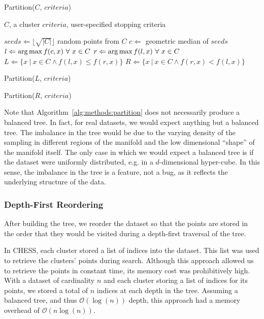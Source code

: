 \begin{algorithm} %
    \caption{Partition($C$, $criteria$)} %
    \label{alg:methods:partition} %
    \begin{algorithmic} %
        \REQUIRE $C$, a cluster
        \REQUIRE $criteria$, user-specified stopping criteria

        \STATE $seeds \Leftarrow \lfloor \sqrt{|C|} \rfloor$ random points from $C$
        \STATE $c \Leftarrow$ geometric median of $seeds$
        \STATE $l \Leftarrow \operatorname*{arg\,max} f(c, x) \ \forall \ x \in C$
        \STATE $r \Leftarrow \argmax f(l, x) \ \forall \ x \in C$
        \STATE $L \Leftarrow \{x \ | \ x \in C \land f(l, x) \le f(r, x)\}$
        \STATE $R \Leftarrow \{x \ | \ x \in C \land f(r, x) < f(l, x)\}$
        
            \STATE Partition($L$, $criteria$)
        \ENDIF
        
            \STATE Partition($R$, $criteria$)
        \ENDIF
    \end{algorithmic}
\end{algorithm}

Note that Algorithm~\ref{alg:methods:partition} does not necessarily produce a balanced tree.
In fact, for real datasets, we would expect anything but a balanced tree.
The imbalance in the tree would be due to the varying density of the sampling in different regions of the manifold and the low dimensional ``shape'' of the manifold itself.
The only case in which we would expect a balanced tree is if the dataset were uniformly distributed, e.g. in a $d$-dimensional hyper-cube.
In this sense, the imbalance in the tree is a feature, not a bug, as it reflects the underlying structure of the data.


\subsubsection{Depth-First Reordering}
\label{sec:methods:clustering:depth-first-reordering}

After building the tree, we reorder the dataset so that the points are stored in the order that they would be visited during a depth-first traversal of the tree.

In CHESS, each cluster stored a list of indices into the dataset.
This list was used to retrieve the clusters' points during search.
Although this approach allowed us to retrieve the points in constant time, its memory cost was prohibitively high.
With a dataset of cardinality $n$ and each cluster storing a list of indices for its points, we stored a total of $n$ indices at each depth in the tree.
Assuming a balanced tree, and thus $\mathcal{O}(\log(n))$ depth, this approach had a memory overhead of $\mathcal{O}(n\log(n))$.


